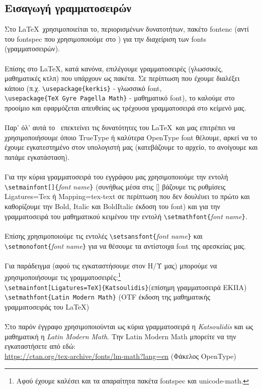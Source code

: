\documentclass[a4paper, 12pt, oneside, xelatex, final]{article}
\begin{document}
	\subsection{Εισαγωγή γραμματοσειρών}
	\noindent Στο \LaTeX\ χρησιμοποιείται το, περιορισμένων δυνατοτήτων, πακέτο fontenc (αντί του fontspec που χρησιμοποιούμε στο \XeLaTeX) για την διαχείριση των fonts (γραμματοσειρών).\\ \\
	Επίσης στο \LaTeX, κατά κανόνα, επιλέγουμε γραμματοσειρές (γλωσσικές, μαθηματικές κτλπ) που υπάρχουν ως πακέτα. Σε περίπτωση που έχουμε διαλέξει κάποιο (π.χ. \verb+\usepackage{kerkis}+ - γλωσσικό font,\\ \verb+\usepackage{TeX Gyre Pagella Math}+ - μαθηματικό font), το καλούμε στο προοίμιο και εφαρμόζεται απευθείας ως τρέχουσα γραμματοσειρά στο κείμενό μας.\\  \\
	Παρ' όλ' αυτά το \XeLaTeX\ επεκτείνει τις δυνατότητες του \LaTeX\ και μας επιτρέπει να χρησιμοποιήσουμε όποιο TrueType ή καλύτερα OpenType font θέλουμε, αρκεί να το έχουμε εγκατεστημένο στον υπολογιστή μας  (κατεβάζουμε το αρχείο, το ανοίγουμε και πατάμε εγκατάσταση).\\ \\
	Για την κύρια γραμματοσειρά του εγγράφου μας χρησιμοποιούμε την εντολή \verb+\setmainfont[]{+\emph{font name}\verb+}+ (συνήθως μέσα στις [] βάζουμε τις ρυθμίσεις Ligatures=Tex ή Mapping=tex-text σε περίπτωση που δεν δουλέυει το πρώτο και καθορίζουμε την Bold, Italic και BoldItalic έκδοση του font) και για την γραμματοσειρά του μαθηματικού κειμένου την εντολή \verb+\setmathfont{+\emph{font name}\verb+}+.\\ \\
	Επίσης χρησιμοποιούμε τις εντολές \verb+\setsansfont{+\emph{font name}\verb+}+ και \verb+\setmonofont{+\emph{font name}\verb+}+ για να θέσουμε τα αντίστοιχα font της αρεσκείας μας.\\ \\
	Για παράδειγμα (αφού τις εγκαταστήσουμε στον Η/Υ μας) μπορούμε να χρησιμοποιήσουμε τις γραμματοσειρές:\footnote{Αφού έχουμε καλέσει και τα απαραίτητα πακέτα fontspec και unicode-math.}\\
	\verb+\setmainfont[Ligatures=TeX]{Katsoulidis}+\quad (επίσημη γραμματοσειρά ΕΚΠΑ)\\
	\verb+\setmathfont{Latin Modern Math}+	 \quad \quad \quad (OTF έκδοση της μαθηματικής γραμματοσειράς του \LaTeX)\\ \\
	Στο παρόν έγγραφο χρησιμοποιούνται ως κύρια γραμματοσειρά η \emph{Katsoulidis} και ως μαθηματική  η \emph{Latin Modern Math}. Την Latin Modern Math μπορείτε να την εγκαταστήσετε από εδώ:\\
	\url{https://ctan.org/tex-archive/fonts/lm-math?lang=en}\; (Φάκελος OpenType)
\end{document}
